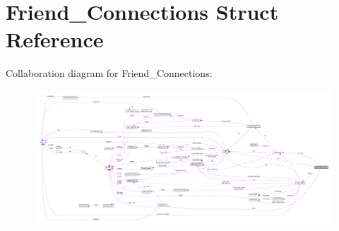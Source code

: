 \hypertarget{struct_friend___connections}{\section{Friend\+\_\+\+Connections Struct Reference}
\label{struct_friend___connections}
}


Collaboration diagram for Friend\+\_\+\+Connections\+:
\nopagebreak
\begin{figure}[H]
\begin{center}
\leavevmode
\includegraphics[width=350pt]{struct_friend___connections__coll__graph}
\end{center}
\end{figure}
